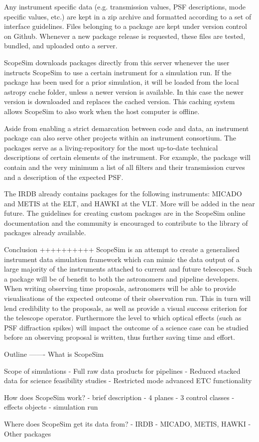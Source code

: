 Any instrument specific data (e.g. transmission values, PSF
descriptions, mode specific values, etc.) are kept in a zip archive and
formatted according to a set of interface guidelines. Files belonging to a
package are kept under version control on Github. Whenever a new package release
is requested, these files are tested, bundled, and uploaded onto a server.

ScopeSim downloads packages directly from this server whenever the user
instructs ScopeSim to use a certain instrument for a simulation run. If the
package has been used for a prior simulation, it will be loaded from the local
astropy cache folder, unless a newer version is available. In this case the
newer version is downloaded and replaces the cached version. This caching system
allows ScopeSim to also work when the host computer is offline.

Aside from enabling a strict demarcation between code and data, an
instrument package can also serve other projects within an instrument
consortium. The packages serve as a living-repository for the most up-to-date
technical descriptions of certain elements of the instrument. For example, the
package will contain and the very minimum a list of all filters and their
transmission curves and a description of the expected PSF.

The IRDB already contains packages for the following instruments: MICADO and
METIS at the ELT, and HAWKI at the VLT. More will be added in the near future.
The guidelines for creating custom packages are in the ScopeSim online
documentation and the community is encouraged to contribute to the library of
packages already available.


Conclusion
++++++++++
ScopeSim is an attempt to create a generalised instrument data simulation
framework which can mimic the data output of a large majority of the instruments
attached to current and future telescopes. Such a package will be of benefit to
both the astronomers and pipeline developers. When writing observing
time proposals, astronomers will be able to provide visualisations of the
expected outcome of their observation run. This in turn will lend credibility
to the proposals, as well as provide a visual success criterion for the
telescope operator. Furthermore the level to which optical effects (such as PSF
diffraction spikes) will impact the outcome of a science case can be studied
before an observing proposal is written, thus further saving time and effort.



Outline
-------
What is ScopeSim

Scope of simulations
- Full raw data products for pipelines
- Reduced stacked data for science feasibility studies
- Restricted mode advanced ETC functionality

How does ScopeSim work?
- brief description
- 4 planes
- 3 control classes
- effects objects
- simulation run

Where does ScopeSim get its data from?
- IRDB
- MICADO, METIS, HAWKI
- Other packages
